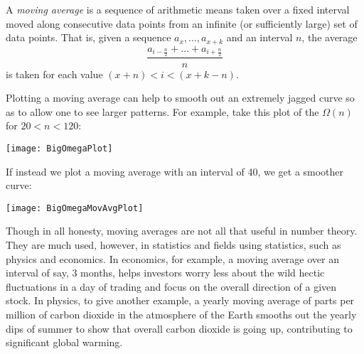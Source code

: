 \documentclass[12pt]{article}
\begin{document}
A {\em moving average} is a sequence of arithmetic means taken over a fixed interval moved along consecutive data points from an infinite (or sufficiently large) set of data points. That is, given a sequence $a_x, \ldots, a_{x + k}$ and an interval $n$, the average $$\frac{a_{i - \frac{n}{2}} + \ldots + a_{i + \frac{n}{2}}}{n}$$ is taken for each value $(x +  n) < i < (x + k - n)$.

Plotting a moving average can help to smooth out an extremely jagged curve so as to allow one to see larger patterns. For example, take this plot of the  $\Omega(n)$ for $20 < n < 120$:

\begin{center}
\texttt{[image: BigOmegaPlot]}
\end{center}

If instead we plot a moving average with an interval of 40, we get a smoother curve:

\begin{center}
\texttt{[image: BigOmegaMovAvgPlot]}
\end{center}

Though in all honesty, moving averages are not all that useful in number theory. They are much used, however, in statistics and fields using statistics, such as physics and economics. In economics, for example, a moving average over an interval of say, 3 months, helps investors worry less about the wild hectic fluctuations in a day of trading and focus on the overall direction of a given stock. In physics, to give another example, a yearly moving average of parts per million of carbon dioxide in the atmosphere of the Earth smooths out the yearly dips of summer to show that overall carbon dioxide is going up, contributing to significant global warming.
\end{document}
